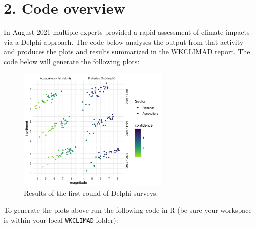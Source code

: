 \documentclass[
]{article}
\begin{document}
\hypertarget{code-overview}{%
\section{2. Code overview}\label{code-overview}}

In August 2021 multiple experts provided a rapid assessment of climate
impacts via a Delphi approach. The code below analyses the output from
that activity and produces the plots and results summarized in the
WKCLIMAD report. The code below will generate the following plots:

\begin{figure}
\centering
\includegraphics[width=0.65\textwidth,height=\textheight]{Figs/Fig1_impacts_1stdephi.png}
\caption{Results of the first round of Delphi surveys.}
\end{figure}

To generate the plots above run the following code in R (be sure your
workspace is within your local \texttt{WKCLIMAD} folder):
\end{document}
